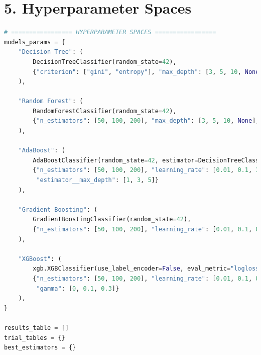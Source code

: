 \documentclass[12pt]{article}
\begin{document}
\section*{5. Hyperparameter Spaces}
\begin{lstlisting}[language=Python]
# ================= HYPERPARAMETER SPACES =================
models_params = {
    "Decision Tree": (
        DecisionTreeClassifier(random_state=42),
        {"criterion": ["gini", "entropy"], "max_depth": [3, 5, 10, None]}
    ),

    "Random Forest": (
        RandomForestClassifier(random_state=42),
        {"n_estimators": [50, 100, 200], "max_depth": [3, 5, 10, None], "criterion": ["gini", "entropy"]}
    ),

    "AdaBoost": (
        AdaBoostClassifier(random_state=42, estimator=DecisionTreeClassifier(random_state=42)),
        {"n_estimators": [50, 100, 200], "learning_rate": [0.01, 0.1, 1],
         "estimator__max_depth": [1, 3, 5]}
    ),

    "Gradient Boosting": (
        GradientBoostingClassifier(random_state=42),
        {"n_estimators": [50, 100, 200], "learning_rate": [0.01, 0.1, 0.5], "max_depth": [3, 5, 7]}
    ),

    "XGBoost": (
        xgb.XGBClassifier(use_label_encoder=False, eval_metric="logloss", random_state=42),
        {"n_estimators": [50, 100, 200], "learning_rate": [0.01, 0.1, 0.3], "max_depth": [3, 5, 7],
         "gamma": [0, 0.1, 0.3]}
    ),
}

results_table = []
trial_tables = {}
best_estimators = {}
\end{lstlisting}
\end{document}
